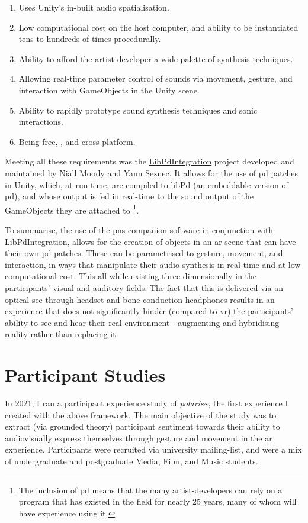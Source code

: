 \begin{enumerate}
    \item Uses Unity's in-built audio spatialisation.
    \item Low computational cost on the host computer, and ability to be instantiated tens to hundreds of times procedurally.
    \item Ability to afford the artist-developer a wide palette of synthesis techniques.
    \item Allowing real-time parameter control of sounds via movement, gesture, and interaction with GameObjects in the Unity scene.
    \item Ability to rapidly prototype sound synthesis techniques and sonic interactions.
    \item Being free, , and cross-platform.
\end{enumerate}

Meeting all these requirements was the \href{https://github.com/LibPdIntegration/LibPdIntegration}{LibPdIntegration} project developed and maintained by Niall Moody and Yann Seznec. It allows for the use of \gls{pd} patches in Unity, which, at run-time, are compiled to libPd (an embeddable version of \gls{pd}), and whose output is fed in real-time to the sound output of the GameObjects they are attached to  \footnote{The inclusion of \gls{pd} means that the many artist-developers can rely on a program that has existed in the field for nearly 25 years, many of whom will have experience using it.}.

To summarise, the use of the \gls{pns} companion software in conjunction with LibPdIntegration, allows for the creation of objects in an \gls{ar} scene that can have their own \gls{pd} patches. These can be parametrised to gesture, movement, and interaction, in ways that manipulate their audio synthesis in real-time and at low computational cost. This all while existing three-dimensionally in the participants' visual and auditory fields. The fact that this is delivered via an optical-see through headset and bone-conduction headphones results in an experience that does not significantly hinder (compared to \gls{vr}) the participants' ability to see and hear their real environment - augmenting and hybridising reality rather than replacing it.



\section{Participant Studies}\label{sec: polaris-study}
In 2021, I ran a participant experience study of \textit{polaris\textasciitilde{}}, the first experience I created with the above framework. The main objective of the study was to extract (via grounded theory) participant sentiment towards their ability to audiovisually express themselves through gesture and movement in the \gls{ar} experience. Participants were recruited via university mailing-list, and were a mix of undergraduate and postgraduate Media, Film, and Music students.

